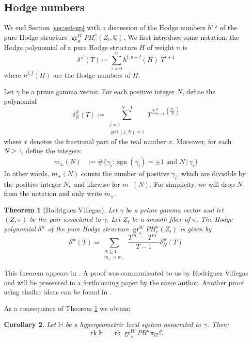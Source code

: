 \documentclass[11pt, reqno]{amsart}
\theoremstyle{plain}
\newtheorem{thm}{Theorem}[section]
\newtheorem{corol}[thm]{Corollary}
\theoremstyle{definition}
\newcommand{\CC}{\mathbb{C}}
\newcommand{\QQ}{\mathbb{Q}}
\newcommand{\HH}{\mathbb{H}}
\DeclareMathOperator{\rk}{rk}
\DeclareMathOperator{\gr}{gr}
\begin{document}
\subsection{Hodge numbers}
\label{sec:hodge}
We end Section \ref{sec:set-up} with a discussion of the Hodge numbers $h^{i,j}$ of the pure Hodge structure $\operatorname{gr}_{\kappa}^W PH^{\kappa}_c(Z_t,\QQ)$. 
We first introduce some notation: the Hodge polynomial of a pure Hodge structure $H$ of weight $n$ is 
\[
\delta^\#(T)\coloneqq \sum_{i=0}^{n} h^{i,n-i}(H) \; T^{i+1}
\] where $h^{i,j}(H)$ are the Hodge numbers of $H$. 

Let $\gamma$ be a prime gamma vector. For each positive integer $N$, define the polynomial
\[ 
\delta_N^{\#}(T):= \sum_{\substack{j=1\\ \gcd(j,N)=1}}^{N-1}  T^{\sum_{i=1}^l \left\{\frac{j \gamma_i }{N} \right\}} 
\] 
where ${x}$ denotes the fractional part of the real number $x$. 
Moreover, for each $N \ge 1$, define the integers:
\begin{align*}
    m_{\pm}(N)&:= \#\{ \gamma_i :  \operatorname{sgn}(\gamma_i)= \pm 1 \text{ and }  N\, | \, \gamma_i \}
\end{align*}
In other words, $m_+(N)$ counts the number of positive $\gamma_i$, which are divisible by the positive integer $N,$ and likewise for $m_-(N)$. For simplicity, we will drop $N$ from the notation and only write $m_\pm$.

\begin{thm}[Rodriguez Villegas]
\label{thm:hodge-deligne}
    Let $\gamma$ be a prime gamma vector and let $(Z, \pi)$ be the pair associated to $\gamma$. Let $Z_t$ be a smooth fiber of $\pi$. The Hodge polynomial $\delta^\#$ of the pure Hodge structure $\operatorname{gr}_{\kappa}^W PH^{\kappa}_c(Z_t)$ is given by
    \[ 
   \delta^\#(T) = \sum_{\substack{N\ge1\\ m_+ > m_-}} \frac{T^{m_+}-T^{m_-}}{T-1} \delta_N^{\#}(T)
    \]
\end{thm}
This theorem appears in \cite{FRV-duke}. A proof was communicated to us by Rodriguez Villegas and will be presented in a forthcoming paper by the same author. Another proof using similar ideas can be found
in \cite{vadym_thesis}.
\smallskip

As a consequence of Theorem \ref{thm:hodge-deligne} we obtain:
\begin{corol} Let $\HH$ be a hypergeometric local system associated to $\gamma$. Then:
\label{cor:rank-eq}
    \begin{equation}
    \label{eq:ranks}
    \rk \HH=\rk \gr_\kappa^W PR^\kappa \pi_{U !}  \CC
    \end{equation}
\end{corol}
\end{document}
